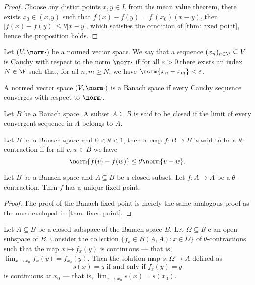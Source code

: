\begin{proof}
Choose any distict points \(x, y \in I\), from the mean value theorem, there
exists \(x_0 \in (x, y)\) such that \(f(x) - f(y) = f'(x_0)(x - y)\), then
\(|f(x) - f(y)| \leq \theta |x - y|\), which satisfies the condition of
\cref{thm: fixed point}, hence the proposition holds.
\end{proof}

\begin{definition}
Let \((V, \norm \cdot)\) be a normed vector space. We say that a sequence
\((x_n)_{n \in \N} \subseteq V\) is Cauchy with respect to the norm \(\norm \cdot\) if for all
\(\varepsilon > 0\) there exists an index \(N \in \N\) such that, for all \(n, m \geq N\), we
have \(\norm{x_n - x_m} < \varepsilon\).
\end{definition}


\begin{definition}\label{def: Banach space}
A normed vector space \((V, \norm \cdot)\) is a Banach space if every Cauchy
sequence converges with respect to \(\norm \cdot\).
\end{definition}

\begin{definition}
Let \(B\) be a Banach space. A subset \(A \subseteq B\) is said to be closed
if the limit of every convergent sequence in \(A\) belongs to \(A\).
\end{definition}

\begin{definition}[Contraction]
\label{def:contraction}
Let \(B\) be a Banach space and \(0 < \theta < 1\), then a map \(f: B \to B\)
is said to be a \(\theta\)-contraction if for all \(v, w \in B\) we have
\[
\norm{f(v) - f(w)} \leq \theta \norm{v - w}.
\]
\end{definition}

\begin{theorem}\label{thm: Banach fixed point}
Let \(B\) be a Banach space and \(A \subseteq B\) be a closed subset. Let \(f:
A \to A\) be a \(\theta\)-contraction. Then \(f\) has a unique fixed point.
\end{theorem}

\begin{proof}
The proof of the Banach fixed point is merely the same analogous proof as the
one developed in \cref{thm: fixed point}.
\end{proof}

\begin{proposition}
\label{prop:fixed-point-stability}
Let \(A \subseteq B\) be a closed subspace of the Banach space \(B\). Let \(\Omega \subseteq B\) e
an open subspace of \(B\). Consider the collection \(\{f_{x} \in B(A, A) \colon x \in
\Omega\}\)   of \(\theta\)-contractions such that the map \(x \mapsto f_x(y)\) is continuous ---
that is, \(\lim_{x\to x_0} f_x(y) = f_{x_0}(y)\).
Then the solution map \(s: \Omega \to A\) defined as
\[
s(x) = y \text{ if and only if } f_x(y) = y
\]
is continuous at \(x_0\) --- that is, \(\lim_{x \to x_0} s(x) = s(x_0)\).
\end{proposition}

